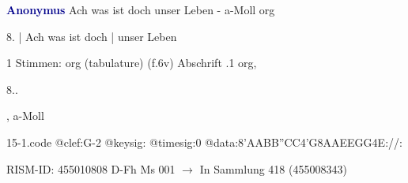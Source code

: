 \documentclass[twocolumn]{book}
\begin{document}
\newline \par \vspace{7pt} \textcolor{darkblue}{\textbf{Anonymus  }}
\newline Ach was ist doch unser Leben - a-Moll
\newline org
\newline \begin{itshape}[f.6v, at left:] 8. | Ach was ist doch | unser Leben\end{itshape} 
\newline \textcolor{darkblue}{}  1 Stimmen: org (tabulature)  (f.6v)
\newline Abschrift
.1  org, \begin{itshape}8..\end{itshape}, a-Moll  
\begin{filecontents*}{15-1.code}
@clef:G-2
@keysig:
@timesig:0
@data:{8'AABB}{''CC}4'G{8AAEE}{GG}4E://:
\end{filecontents*}
\newline
%
\newline RISM-ID: 455010808
\newline D-Fh  Ms 001
\newline $\rightarrow$ In Sammlung 418 (455008343)
      
\end{document}
